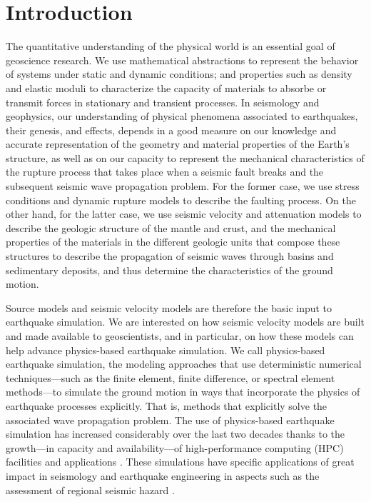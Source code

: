 
\section{Introduction}
\label{sec:introduction}

The quantitative understanding of the physical world is an essential goal of geoscience research. We use mathematical abstractions to represent the behavior of systems under static and dynamic conditions; and properties such as density and elastic moduli to characterize the capacity of materials to absorbe or transmit forces in stationary and transient processes. In seismology and geophysics, our understanding of physical phenomena associated to earthquakes, their genesis, and effects, depends in a good measure on our knowledge and accurate representation of the geometry and material properties of the Earth's structure, as well as on our capacity to represent the mechanical characteristics of the rupture process that takes place when a seismic fault breaks and the subsequent seismic wave propagation problem. For the former case, we use stress conditions and dynamic rupture models to describe the faulting process. On the other hand, for the latter case, we use seismic velocity and attenuation models to describe the geologic structure of the mantle and crust, and the mechanical properties of the materials in the different geologic units that compose these structures to describe the propagation of seismic waves through basins and sedimentary deposits, and thus determine the characteristics of the ground motion.

Source models and seismic velocity models are therefore the basic input to earthquake simulation. We are interested on how seismic velocity models are built and made available to geoscientists, and in particular, on how these models can help advance physics-based earthquake simulation. We call physics-based earthquake simulation, the modeling approaches that use deterministic numerical techniques---such as the finite element, finite difference, or spectral element methods---to simulate the ground motion in ways that incorporate the physics of earthquake processes explicitly. That is, methods that explicitly solve the associated wave propagation problem. The use of physics-based earthquake simulation has increased considerably over the last two decades thanks to the growth---in capacity and availability---of high-performance computing (HPC) facilities and applications \citep[e.g.,][]{Aagaard_2008_BSSA2, Olsen_2009_GRL, Bielak_2010_GJI, Cui_2010_Proc}. These simulations have specific applications of great impact in seismology and earthquake engineering in aspects such as the assessment of regional seismic hazard \citep[e.g.,][]{Graves_2011_PAG}.

